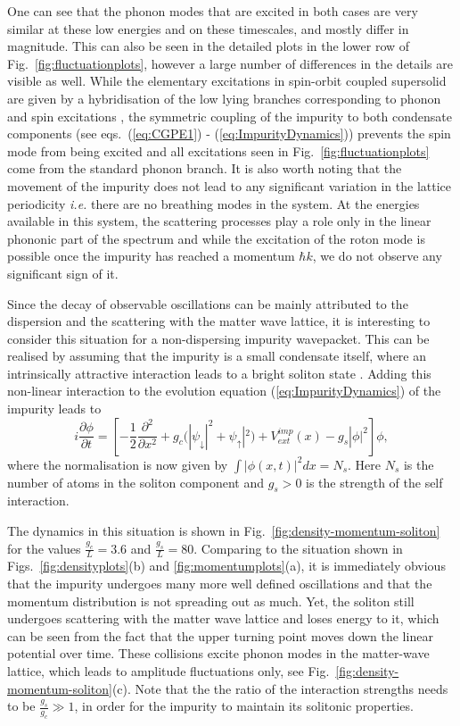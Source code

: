\documentclass[12pt]{iopart}
\begin{document}
One can see that the phonon modes that are excited in both cases are very similar at these low energies and on these timescales, and mostly differ in magnitude. This can also be seen in the detailed plots in the lower row of Fig.~\ref{fig:fluctuationplots}, however a large number of differences in the details are visible as well. While the elementary excitations in spin-orbit coupled supersolid are given by a hybridisation of the low lying branches corresponding to phonon and spin excitations \cite{Saccani_2012}, the symmetric coupling of the impurity to both condensate components (see eqs.~(\ref{eq:CGPE1}) - (\ref{eq:ImpurityDynamics})) prevents the spin mode from being excited \cite{Geier:2021} and all excitations seen in  Fig.~\ref{fig:fluctuationplots} come from the standard phonon branch. It is also worth noting that the movement of the impurity does not lead to any significant variation in the lattice periodicity \textit{i.e.} there are no breathing modes in the system. At the energies available in this system, the scattering processes play a role only in the linear phononic part of the spectrum and while the excitation of the roton mode is possible once the impurity has reached a momentum $\hbar k$, we do not observe any significant sign of it.


Since the decay of observable oscillations can be mainly attributed to the dispersion and the scattering with the matter wave lattice, it is interesting to consider this situation for a non-dispersing impurity wavepacket. This can be realised by assuming that the impurity is a small condensate itself, where an intrinsically attractive interaction leads to a bright soliton state \cite{hulet:2002,shabat:1972,malomed:2011}. Adding this non-linear interaction to the evolution equation (\ref{eq:ImpurityDynamics}) of the impurity leads to
\begin{equation}
    i\frac{\partial\phi}{\partial t} =\left[-\frac{1}{2}\frac{\partial^2}{\partial x^2}+g_c(|\psi_{\downarrow}|^2+\psi_{\uparrow}|^2)+V_{{ext}}^{{imp}}(x)-g_s|\phi|^2 \right]\phi,
\end{equation}
where the normalisation is now given by $\int |\phi(x,t)|^2dx =N_s$. Here $N_s$ is the number of atoms in the soliton component and $g_s>0$ is the strength of the self interaction.

The dynamics in this situation is shown in Fig.~\ref{fig:density-momentum-soliton} for the values $\frac{g_c}{L}=3.6$ and $\frac{g_s}{L}=80$. Comparing to the situation shown in Figs.~\ref{fig:densityplots}(b) and \ref{fig:momentumplots}(a), it is immediately obvious that the impurity undergoes many more well defined oscillations and that the momentum distribution is not spreading out as much. Yet, the soliton still undergoes scattering with the matter wave lattice and loses energy to it, which can be seen from the fact that the upper turning point moves down the linear potential over time. These collisions excite phonon modes in the matter-wave lattice, which leads to amplitude fluctuations only, see Fig.~\ref{fig:density-momentum-soliton}(c). Note that the the ratio of the interaction strengths needs to be $\frac{g_s}{g_c}\gg 1$, in order for the impurity to maintain its solitonic properties. 
\end{document}
